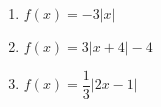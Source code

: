 \begin{multicols}{3}
\begin{enumerate}
\setcounter{enumi}{\value{HW}}

\item $f(x) = -3|x|$ 
\item $f(x) = 3|x + 4| - 4$ 
\item $f(x) = \dfrac{1}{3}|2x - 1|$ \label{graphabsvalexerlast}

\setcounter{HW}{\value{enumi}}
\end{enumerate}
\end{multicols}
